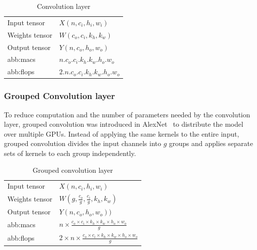             \begin{table}[hbt!]
                \caption{Convolution layer}
                \begin{tabularx}{\textwidth}{@{}XX@{}}
                \toprule
                  Input tensor  &  $X(n, c_i,  h_i, w_i)$\\
                  Weights tensor  &  $W(c_o, c_i, k_h, k_w)$\\
                  Output tensor  &  $Y(n, c_o, h_o, w_o)$\\
                  \gls{abb:macs}  &  $n.c_o.c_i.k_h.k_w.h_o.w_o$\\
                  \gls{abb:flops} &  $2.n.c_o.c_i.k_h.k_w.h_o.w_o$\\
                \bottomrule
                \end{tabularx}
            \end{table}
            
            
        \subsubsection{Grouped Convolution layer}
        
            To reduce computation and the number of parameters needed by the convolution layer, grouped convolution was introduced in AlexNet~\cite{conv} to distribute the model over multiple GPUs. Instead of applying the same kernels to the entire input, grouped convolution divides the input channels into $g$ groups and applies separate sets of kernels to each group independently.
            
            \begin{table}[hbt!]
                \caption{Grouped convolution layer}
                \begin{tabularx}{\textwidth}{@{}XX@{}}
                \toprule
                  Input tensor  &  $X(n, c_i,  h_i, w_i)$\\
                  Weights tensor  &  $W(g, \frac{c_o}{g} , \frac{c_i}{g} , k_h, k_w)$\\
                  Output tensor  &  $Y(n, c_o, h_o, w_o))$\\
                  \gls{abb:macs}  &  $n\times \frac{c_o\times c_i \times k_h \times k_w \times h_o \times w_o}{g}$\\
                  \gls{abb:flops} &  $2 \times n \times \frac{c_o \times c_i \times k_h \times k_w \times h_o \times w_o}{g}$\\
                \bottomrule
                \end{tabularx}
            \end{table}
            
